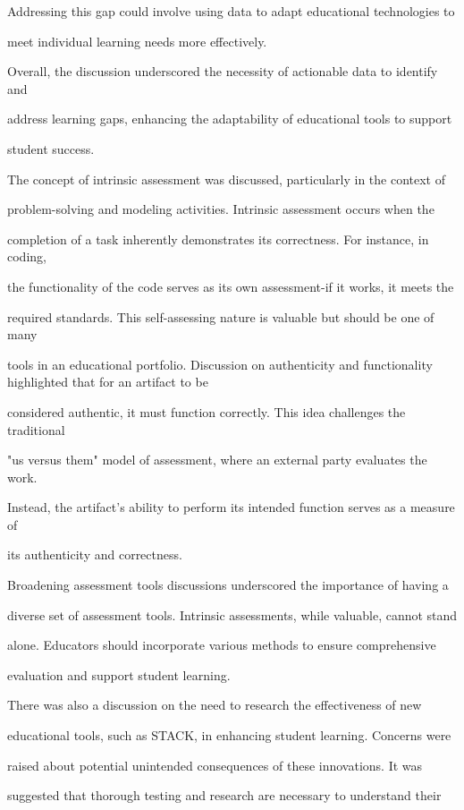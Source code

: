 \documentclass[11pt]{article}
\begin{document}
Addressing this gap could involve using data to adapt educational technologies to

meet individual learning needs more effectively.

Overall, the discussion underscored the necessity of actionable data to identify and

address learning gaps, enhancing the adaptability of educational tools to support

student success.

The concept of intrinsic assessment was discussed, particularly in the context of

problem-solving and modeling activities. Intrinsic assessment occurs when the

completion of a task inherently demonstrates its correctness. For instance, in coding,

the functionality of the code serves as its own assessment-if it works, it meets the

required standards. This self-assessing nature is valuable but should be one of many

tools in an educational portfolio. Discussion on authenticity and functionality highlighted that for an artifact to be

considered authentic, it must function correctly. This idea challenges the traditional

"us versus them" model of assessment, where an external party evaluates the work.

Instead, the artifact's ability to perform its intended function serves as a measure of

its authenticity and correctness.

Broadening assessment tools discussions underscored the importance of having a

diverse set of assessment tools. Intrinsic assessments, while valuable, cannot stand

alone. Educators should incorporate various methods to ensure comprehensive

evaluation and support student learning.

There was also a discussion on the need to research the effectiveness of new

educational tools, such as STACK, in enhancing student learning. Concerns were

raised about potential unintended consequences of these innovations. It was

suggested that thorough testing and research are necessary to understand their
\end{document}
